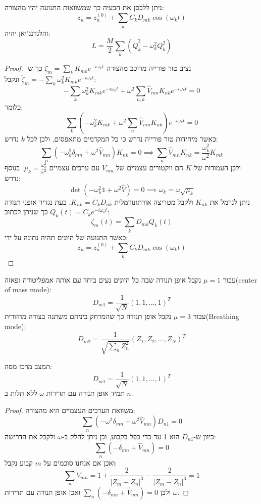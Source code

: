 \documentclass{tstextbook}
\begin{document}
\begin{proposition}
ניתן ללכסן את הבעיה כך שמשוואות התנועה יהיו מהצורה:
$$z_{n}=z_{n}^{(0)}+\sum_{k}C_{k}D_{m k}\cos\left(\omega_{k}t\right)$$
והלגרנג'יאן יהיה:
$$ L = \frac{M}{2} \sum_k (\dot{Q}_k^2 - \omega_k^2 Q_k^2) $$

\end{proposition}
\begin{proof}
נציב טור פורייה מרוכב מהצורה \(\zeta_{m}=\sum_{k}K_{m k}e^{-i\omega_{k}t}\) כך ש-\(\ddot{\zeta}_{m}=-\sum_{k}\omega_{k}^{2}K_{m k}e^{-i\omega_{k}t}\) ונקבל:
$$-\sum_{k}\omega_{k}^{2}K_{m k}e^{-i\omega_{k}t}+\omega^{2}\!\sum_{n,k}\!\hat{V}_{m n}K_{n k}e^{-i\omega_{k}t}=0$$
כלומר:
$$\sum_{k}\left(-\omega_{k}^{2}K_{m k}+\omega^{2}\sum_{n}\hat{V}_{m n}K_{n k}\right)e^{-i\omega_{k}t}=0$$
כאשר מיחידות טור פורייה נדרש כי כל המקדמים מתאפסים, ולכן לכל \(k\) נדרש:
$$\sum_{n}\left(-\omega_{k}^{2}\delta_{m n}+\omega^{2}\hat{V}_{m n}\right)K_{n k}=0\implies  \sum_n \hat{V}_{mn} K_{nk} = \frac{\omega_k^2}{\omega^2} K_{mk} $$
ולכן העמודות של \(K\) הם ווקטורים עצמיים של \(V_{mn}\) עם ערכים עצמיים \(\mu_{k}=\frac{\omega_{k}^{2}}{\omega^{2}}\). בנוסף נדרש:
$$\operatorname*{det}\left(-\omega_{k}^{2}\mathbb{1}+\omega^{2}\hat{V}\right)=0\implies \omega_{k}=\omega \sqrt{ \mu_{k} }$$
ניתן לנרמל את \(K_{nk}\) ולקבל מטריצה אורתונורמלית \(K_{nk}=C_{k}D_{nk}\). כעת נגדיר אופני תנודה \(Q_{k}(t)=C_{k}e^{ -i\omega_{k}t }\) כך שניתן לכתוב:
$$\zeta_{m}\left(t\right)=\sum_{k}D_{m k}Q_{k}\left(t\right)$$
כאשר התנועה של היונים תהיה נתונה על ידי:
$$z_{n}=z_{n}^{(0)}+\sum_{k}C_{k}D_{m k}\cos\left(\omega_{k}t\right)$$

\end{proof}
\begin{example}
עבור \(\mu=1\) נקבל אופן תנודה שבה כל היונים נעים ביחד עם אותה אמפליטודה ופאזה(center of mass mode):
$$ D_{m1} = \frac{1}{\sqrt{N}}(1, 1, ..., 1)^T $$
עבור \(\mu=3\) נקבל אופן תנודה כך שהמרחק ביניהם משתנה בצורה מחזורית(Breathing mode):
$$ D_{m2} = \frac{1}{\sqrt{\sum_n Z_n^2}} (Z_1, Z_2, ..., Z_N)^T $$

\end{example}
\begin{proposition}
המצב מרכז מסה:
$$ D_{m1} = \frac{1}{\sqrt{N}}(1, 1, ..., 1)^T $$
תמיד אופן תנודה עם תדירות \(\omega\) ללא תלות ב-\(n\).

\end{proposition}
\begin{proof}
משוואת הערכים העצמיים היא מהצורה:
$$ \sum_{n}(-\omega^{2}\delta_{mn}+\omega^{2}\hat{V}_{mn})D_{n1}=0 $$
כיוון ש-\(D_{n 1}\) הוא 1 עד כדי כפל בקבוע, וכן ניתן לחלק ב-\(\omega\) ולקבל את הדרישה:
$$ \sum_{n}(-\delta_{mn}+\hat{V}_{mn})=0 $$
ואכן אם אנחנו סוכמים על \(m\) קבוע נקבל:
$$\sum_{n} V_{mn}=1 + {\frac{2}{|Z_{m}-Z_{n}|^{3}}}- \frac{2}{|Z_{m}-Z_{n}|^{3}} = 1$$
ולכן \(\sum_{n}(-\delta_{mn}+\hat{V}_{mn}) = 0\) ואכן אופן תנודה עם תדירות \(\omega\).

\end{proof}
\end{document}
